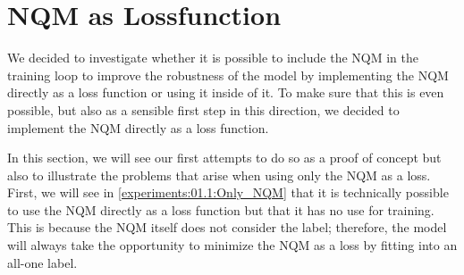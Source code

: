 \section{NQM as Lossfunction}
\label{experiments:01.0:Into}

We decided to investigate whether it is possible to include the NQM in the training loop to improve the robustness of the model by implementing the NQM directly as a loss function  or using it inside of it. To make sure that this is even possible, but also as a sensible first step in this direction, we decided to implement the NQM directly as a loss function.

In this section, we will see our first attempts to do so as a proof of concept but also to illustrate the problems that arise when using only the NQM as a loss. First, we will see in \autoref{experiments:01.1:Only_NQM} that it is technically possible to use the NQM directly as a loss function but that it has no use for training. This is because the NQM itself does not consider the label; therefore, the model will always take the opportunity to minimize the NQM as a loss by fitting into an all-one label.

